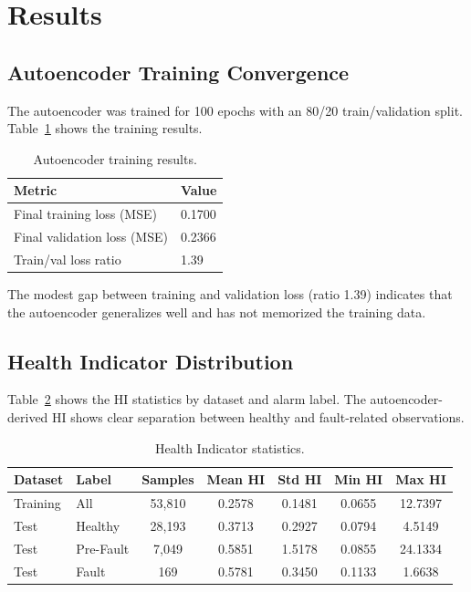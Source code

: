 \documentclass[preprint,12pt]{elsarticle}
\begin{document}
\section{Results}
\label{sec:results}

\subsection{Autoencoder Training Convergence}

The autoencoder was trained for 100 epochs with an 80/20 train/validation split. Table~\ref{tab:ae_results} shows the training results.

\begin{table}[H]
\centering
\caption{Autoencoder training results.}
\label{tab:ae_results}
\begin{tabular}{ll}
\toprule
Metric & Value \\
\midrule
Final training loss (MSE) & 0.1700 \\
Final validation loss (MSE) & 0.2366 \\
Train/val loss ratio & 1.39 \\
\bottomrule
\end{tabular}
\end{table}

The modest gap between training and validation loss (ratio 1.39) indicates that the autoencoder generalizes well and has not memorized the training data.

\subsection{Health Indicator Distribution}

Table~\ref{tab:hi_stats} shows the HI statistics by dataset and alarm label. The autoencoder-derived HI shows clear separation between healthy and fault-related observations.

\begin{table}[H]
\centering
\caption{Health Indicator statistics.}
\label{tab:hi_stats}
\begin{tabular}{llccccc}
\toprule
Dataset & Label & Samples & Mean HI & Std HI & Min HI & Max HI \\
\midrule
Training & All & 53,810 & 0.2578 & 0.1481 & 0.0655 & 12.7397 \\
Test & Healthy & 28,193 & 0.3713 & 0.2927 & 0.0794 & 4.5149 \\
Test & Pre-Fault & 7,049 & 0.5851 & 1.5178 & 0.0855 & 24.1334 \\
Test & Fault & 169 & 0.5781 & 0.3450 & 0.1133 & 1.6638 \\
\bottomrule
\end{tabular}
\end{table}
\end{document}
